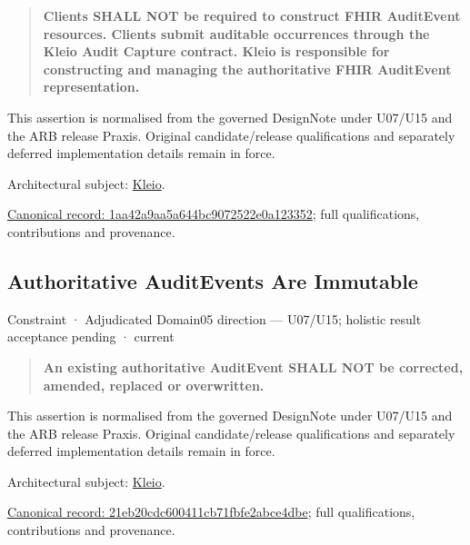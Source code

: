 \begin{quote}


\textbf{Clients SHALL NOT be required to construct FHIR AuditEvent resources. Clients submit auditable occurrences through the Kleio Audit Capture contract. Kleio is responsible for constructing and managing the authoritative FHIR AuditEvent representation.}



\end{quote}


This assertion is normalised from the governed DesignNote under U07/U15 and the ARB release Praxis. Original candidate/release qualifications and separately deferred implementation details remain in force.



Architectural subject: \hyperref[element:fefda110e2274884ad58906733606efd]{Kleio}.


{\footnotesize \href{../../../../continuum/motivation/constraint/1aa42a9aa5a644bc9072522e0a123352.md}{Canonical record: 1aa42a9aa5a644bc9072522e0a123352}; full qualifications, contributions and provenance.}\par
\subsection{Authoritative AuditEvents Are Immutable}

\label{element:21eb20cdc600411cb71fbfe2abce4dbe}
{\small Constraint · Adjudicated Domain05 direction — U07/U15; holistic result acceptance pending · current}\par

\begin{quote}


\textbf{An existing authoritative AuditEvent SHALL NOT be corrected, amended, replaced or overwritten.}



\end{quote}


This assertion is normalised from the governed DesignNote under U07/U15 and the ARB release Praxis. Original candidate/release qualifications and separately deferred implementation details remain in force.



Architectural subject: \hyperref[element:fefda110e2274884ad58906733606efd]{Kleio}.


{\footnotesize \href{../../../../continuum/motivation/constraint/21eb20cdc600411cb71fbfe2abce4dbe.md}{Canonical record: 21eb20cdc600411cb71fbfe2abce4dbe}; full qualifications, contributions and provenance.}\par

